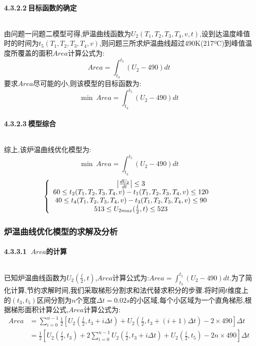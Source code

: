 \documentclass[12pt]{ctexart}
\numberwithin{figure}{section}
\numberwithin{table}{section}
\begin{document}
\paragraph{4.3.2.2$\ $目标函数的确定}$\ $

由问题一问题二模型可得,炉温曲线函数为$U_2(T_1,T_2,T_3,T_4,v,t)$,设到达温度峰值时的时间为$t_5(T_1,T_2,T_3,T_4,v)$,则问题三所求炉温曲线超过490K(217ºC)到峰值温度所覆盖的面积$Area$计算公式为:
\begin{equation}
    Area=\int_{t_3}^{t_5}(U_2-490)dt
\end{equation}
要求$Area$尽可能的小,则该模型的目标函数为:
\begin{equation}
   \min\  Area=\int_{t_3}^{t_5}(U_2-490)dt
\end{equation}

\paragraph{4.3.2.3$\ $模型综合}$\ $

综上,该炉温曲线优化模型为:
\begin{equation}
   \min\  Area=\int_{t_3}^{t_5}(U_2-490)dt
\end{equation}
\begin{equation}
\left\{
\begin{array}{cc}

\left|\frac{d U_2}{d t}\right|\leq3\\
60\leq t_2(T_1,T_2,T_3,T_4,v)-t_1(T_1,T_2,T_3,T_4,v)\leq120\\
40\leq t_4(T_1,T_2,T_3,T_4,v)-t_3(T_1,T_2,T_3,T_4,v)\leq90\\
513\leq U_{2max}(\frac{l}{2},t)\leq523
\end{array}\right. \\
\end{equation}
\subsubsection{炉温曲线优化模型的求解及分析}
\paragraph{4.3.3.1$\ $ $Area$的计算}$\ $

已知炉温曲线函数为$U_2(\frac{l}{2},t)$,$Area$计算公式为:$ Area=\int_{t_3}^{t_5}(U_2-490)dt$.为了简化计算,节约求解时间,我们采取梯形分割求和法代替求积分的步骤.将时间$t$维度上的$(t_3,t_5)$区间分割为$n$个宽度$\Delta t=0.02s$的小区域,每个小区域为一个直角梯形,根据梯形面积计算公式,$Area$计算公式为:
\begin{equation}
  \begin{split}
Area&=\sum\limits_{i=0}^{n-1}\frac{1}{2} [U_2(\frac{l}{2},t_3+i\Delta t)+U_2(\frac{l}{2},t_3+(i+1)\Delta t)-2\times490]\Delta t\\
&=\frac{1}{2}[U_2(\frac{l}{2},t_3)+2\sum\limits_{i=0}^{n-1}U_2(\frac{l}{2},t_3+i\Delta t)+U_2(\frac{l}{2},t_5)-2n\times490]\Delta t
\end{split}
\end{equation}
\end{document}
